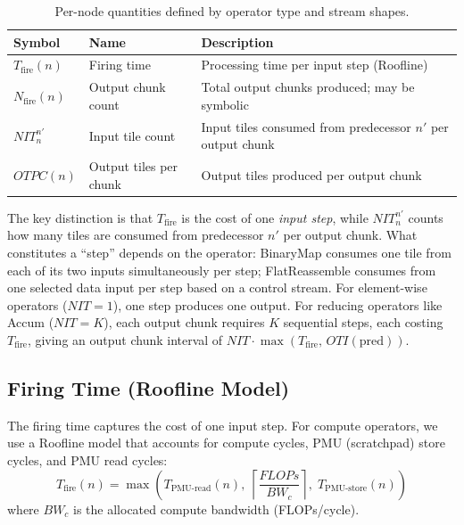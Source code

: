 \documentclass[10pt]{article}
\begin{document}
\begin{table}[h]
\centering
\begin{tabular}{@{}lll@{}}
\toprule
\textbf{Symbol} & \textbf{Name} & \textbf{Description} \\
\midrule
$T_{\text{fire}}(n)$ & Firing time & Processing time per input step (Roofline) \\
$N_{\text{fire}}(n)$ & Output chunk count & Total output chunks produced; may be symbolic \\
$\mathit{NIT}^{n'}_n$ & Input tile count & Input tiles consumed from predecessor $n'$ per output chunk \\
$\mathit{OTPC}(n)$ & Output tiles per chunk & Output tiles produced per output chunk \\
\bottomrule
\end{tabular}
\caption{Per-node quantities defined by operator type and stream shapes.}
\label{tab:node-info}
\end{table}

The key distinction is that $T_{\text{fire}}$ is the cost of one \emph{input step}, while $\mathit{NIT}^{n'}_n$ counts how many tiles are consumed from predecessor $n'$ per output chunk. What constitutes a ``step'' depends on the operator: BinaryMap consumes one tile from each of its two inputs simultaneously per step; FlatReassemble consumes from one selected data input per step based on a control stream. For element-wise operators ($\mathit{NIT} = 1$), one step produces one output. For reducing operators like Accum ($\mathit{NIT} = K$), each output chunk requires $K$ sequential steps, each costing $T_{\text{fire}}$, giving an output chunk interval of $\mathit{NIT} \cdot \max(T_{\text{fire}},\, \mathit{OTI}(\text{pred}))$.

\subsection{Firing Time (Roofline Model)}

The firing time captures the cost of one input step. For compute operators, we use a Roofline model that accounts for compute cycles, PMU (scratchpad) store cycles, and PMU read cycles:
\begin{equation}
    T_{\text{fire}}(n) = \max\!\left(
        T_{\text{PMU-read}}(n),\;
        \left\lceil\frac{\mathit{FLOPs}}{\mathit{BW}_c}\right\rceil,\;
        T_{\text{PMU-store}}(n)
    \right)
    \label{eq:tfire}
\end{equation}
where $\mathit{BW}_c$ is the allocated compute bandwidth (FLOPs/cycle).
\end{document}
